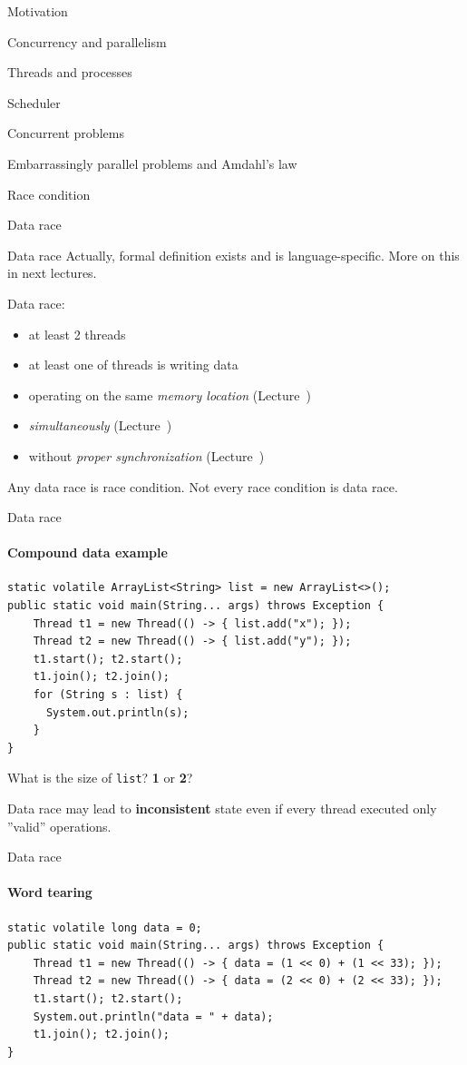 \begin{section}{Motivation}
\begin{section}{Concurrency and parallelism}
\begin{section}{Threads and processes}
\begin{section}{Scheduler}
\begin{section}{Concurrent problems}
\begin{subsection}{Embarrassingly parallel problems and Amdahl's law}
\begin{subsection}{Race condition}
\begin{subsection}{Data race}
\begin{frame}{Data race}
Actually, formal definition exists and is language-specific. More on this in next lectures.

Data race:
\begin{itemize}
    \item at least 2 threads
    \item at least one of threads is writing data
    \item operating on the same \textit{memory location} (Lecture~\cacheCoherencyNum)
    \item \textit{simultaneously} (Lecture~\foundationsNum)
    \item without \textit{proper synchronization} (Lecture~\langMMNum)
\end{itemize}

Any data race is race condition. Not every race condition is data race.

\end{frame}


\begin{frame}[fragile]{Data race}
\framesubtitle{Compound data example}

\begin{verbatim}
static volatile ArrayList<String> list = new ArrayList<>();
public static void main(String... args) throws Exception {
    Thread t1 = new Thread(() -> { list.add("x"); });
    Thread t2 = new Thread(() -> { list.add("y"); });
    t1.start(); t2.start();
    t1.join(); t2.join();
    for (String s : list) {
      System.out.println(s);
    }
}
\end{verbatim}

\pause 

What is the size of \texttt{list}? \textbf{1} or \textbf{2}?

\pause

Data race may lead to \textbf{inconsistent} state even if every thread executed only ''valid'' operations.
\end{frame}

\begin{frame}[fragile]{Data race}
\framesubtitle{Word tearing}

\begin{verbatim}
static volatile long data = 0;
public static void main(String... args) throws Exception {
    Thread t1 = new Thread(() -> { data = (1 << 0) + (1 << 33); });
    Thread t2 = new Thread(() -> { data = (2 << 0) + (2 << 33); });
    t1.start(); t2.start();
    System.out.println("data = " + data);
    t1.join(); t2.join();
}
\end{verbatim}


\end{frame}
\end{subsection}
\end{subsection}
\end{subsection}
\end{section}
\end{section}
\end{section}
\end{section}
\end{section}
